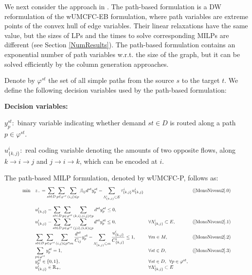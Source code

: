 We next consider the approach in .
 The path-based formulation is a DW  reformulation of the wUMCFC-EB formulation, where path variables are extreme points of the convex hull of edge variables.
Their linear relaxations have the same value, but the sizes of LPs and the times to solve corresponding MILPs are different (see Section \ref{NumResults}). The path-based formulation contains an exponential number of path variables w.r.t. the size of the graph, but it can be solved efficiently by the column generation approaches.  

Denote by \(\varphi^{st}\) the set of all simple paths from the source \(s\) to the target \(t\).
We define the following decision variables used by the path-based formulation:

\textbf{Decision variables:}

\(y_p^{st}: \) binary variable indicating whether demand \(st \in D\) is routed along a path \(p \in \varphi^{st}\).

\(u^i_{\{k,j\}}:\) real coding variable denoting the amounts of two opposite flows, along \(k \to i \to j\) and \(j \to i \to k\), which can be encoded at \(i\).

The path-based MILP formulation, denoted by wUMCFC-P, follows as:
\begin{equation}
\resizebox{0.91\hsize}{!}{$
\begin{array}{llll}
\min &z_{-} =  \displaystyle\sum_{st \in D} \displaystyle \sum_{p \in \varphi^{st}} \displaystyle \sum_{(i,j) \in p} \displaystyle \beta_{ij} d^{st} y_p^{st}   -  \displaystyle \sum_{\Lambda^i_{\{k,j\}} \subset E}   \tau^i_{\{k,j\}}u^i_{\{k,j\}}        &&  (\ref{MonoNiveau2}.0)\\
\\
&u^i_{\{k,j\}} - \displaystyle\sum_{st \in D}\displaystyle \sum_{p \in \varphi^{st}} \displaystyle \sum_{(k,i),(i,j) \in p }d^{st} y_p^{st} \leq 0,  &  &\\
&u^i_{\{k,j\}} - \displaystyle\sum_{st \in D}\displaystyle \sum_{p \in \varphi^{st}} \displaystyle \sum_{(j,i),(i,k) \in p }d^{st} y_p^{st} \leq 0,  &  \forall \Lambda^i_{\{k,j\}} \subset  E, &(\ref{MonoNiveau2}.1)\\
&\displaystyle \sum_{st \in D} \displaystyle \sum_{p \in \varphi^{st}} \displaystyle \sum_{(i,j) \in p \cap m} \frac{d^{st}}{C_{ij}} y_p^{st}  - \displaystyle \sum_{ \Lambda^i_{\{k,j\}}  \subset m}    \frac{u^i_{\{k,j\}}}{C^i_{\{k,j\}}}   \leq 1,  & \forall m \in M,  & (\ref{MonoNiveau2}.2)\\
& \displaystyle \sum_{p \in \varphi^{st}} y_p^{st}  = 1,                                     &  \forall st \in D, & (\ref{MonoNiveau2}.3) \\
& y_p^{st} \in \{0,1\}, & \forall st \in D,\enspace \forall p \in \varphi^{st}, &\\
& u^i_{\{k,j\}} \in \mathbb{R}_{+}, & \forall    \Lambda^i_{\{k,j\}}  \subset E &
\end{array}
$}
\label{MonoNiveau2}
\end{equation}





